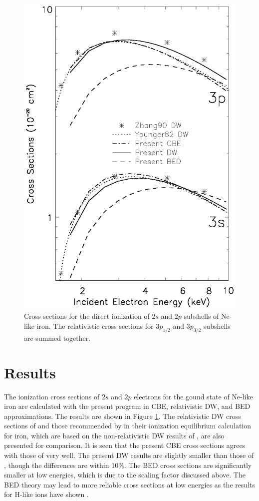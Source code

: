 \documentclass[preprint, floatfix, pra, showpacs, showkeys]{revtex4}
\begin{document}
\begin{figure}
\includegraphics[width=5in]{ion.eps}
\caption{\label{fig_comparison}Cross sections for the direct
ionization of $2s$ and $2p$ subshells of Ne-like iron. The relativistic cross
sections for $3p_{1/2}$ and $3p_{3/2}$ subshells are summed together.} 
\end{figure}

\section{Results}
\label{sec_results}
The ionization cross sections of $2s$ and $2p$ electrons for the gound state
of Ne-like iron are calculated with the present program in CBE, relativistic
DW, and BED approximations. 
The results are shown in Figure \ref{fig_comparison}. The relativistic DW
cross sections of \textcite{zhang90} and those recommended by
\textcite{arnaud92} in their ionization equilibrium 
calculation for iron, which are based on the non-relativistic DW results of
\textcite{younger82}, are also presented for comparison. It is seen that the
present CBE cross sections agrees with those of \textcite{younger82} very
well. The present DW results are slightly smaller than those of
\textcite{zhang90}, though the differences are within 10\%. The BED cross
sections are significantly smaller at low energies, which is due to the
scaling factor discussed above. The BED theory may lead to more reliable
cross sections at low energies as the results for H-like ions have shown
\cite{kim94}.
\end{document}
